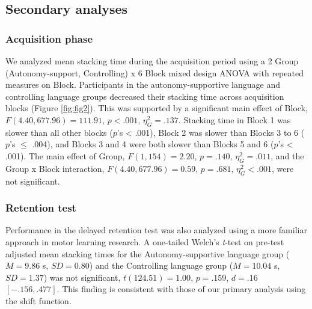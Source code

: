 \documentclass[doc,floatsintext,donotrepeattitle,letterpaper,12pt]{apa7}
\begin{document}
\clearpage

\subsection{Secondary analyses}

\subsubsection{Acquisition phase}

We analyzed mean stacking time during the acquisition period using a 2 Group (Autonomy-support, Controlling) x 6 Block mixed design ANOVA with repeated measures on Block. Participants in the autonomy-supportive language and controlling language groups decreased their stacking time across acquisition blocks (Figure \ref{fig:fig2}). This was supported by a significant main effect of Block, $F(4.40, 677.96) = 111.91$, $p < .001$, $\eta_{G}^2 = .137$. Stacking time in Block 1 was slower than all other blocks ($p$'s < .001), Block 2 was slower than Blocks 3 to 6 ($p$'s $\leq$ .004), and Blocks 3 and 4 were both slower than Blocks 5 and 6 ($p$'s < .001). The main effect of Group, $F(1, 154) = 2.20$, $p = .140$, $\eta_{G}^2 = .011$, and the Group x Block interaction, $F(4.40, 677.96) = 0.59$, $p = .681$, $\eta_{G}^2 < .001$, were not significant.

\subsubsection{Retention test}

Performance in the delayed retention test was also analyzed using a more familiar approach in motor learning research. A one-tailed Welch's \emph{t}-test on pre-test adjusted mean stacking times for the Autonomy-supportive language group ($M = 9.86$ s, $SD = 0.80$) and the Controlling language group ($M = 10.04$ s, $SD = 1.37$) was not significant, $t(124.51) = 1.00$, $p = .159$, $d = .16$ $[-.156, .477]$. This finding is consistent with those of our primary analysis using the shift function.

\clearpage
\end{document}
